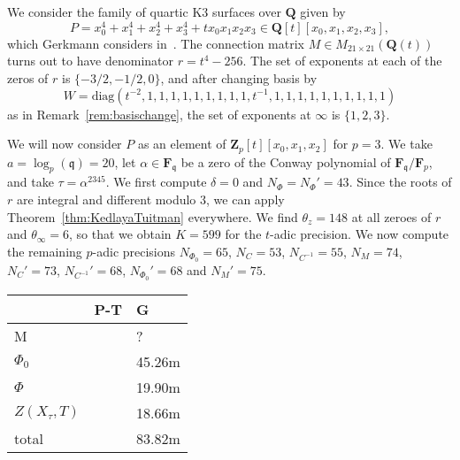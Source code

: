 \documentclass[a4paper,11pt]{article}
\numberwithin{equation}{section}
\newcommand{\ZZ}{\mathbf{Z}} %
\newcommand{\QQ}{\mathbf{Q}} %
\newcommand{\FF}{\mathbf{F}} %
\theoremstyle{definition}
\begin{document}
We consider the family of quartic K3 surfaces over $\QQ$ given by
\begin{equation*}
P=x_0^4 + x_1^4 + x_2^4 + x_3^4 + t x_0 x_1 x_2 x_3 \in \QQ[t][x_0,x_1,x_2,x_3],
\end{equation*}
which Gerkmann considers in~\citep[\S 7.5]{Gerkmann2007}. The connection matrix 
$M \in M_{21 \times 21}(\QQ(t))$ turns out to have denominator 
$r=t^4-256$. The set of exponents at each of the zeros of $r$ is $\{-3/2,-1/2,0\}$, 
and after changing basis by
\[
W=\mbox{diag}(t^{-2},1,1,1,1,1,1,1,1,1,t^{-1},1,1,1,1,1,1,1,1,1,1)
\] 
as in Remark~\ref{rem:basischange}, the set of exponents  at $\infty$ is 
$\{1,2,3\}$. 

We will now consider $P$ as an element of $\ZZ_p[t][x_0,x_1,x_2]$
for $p=3$. We take $a=\log_p(\mathfrak{q})=20$, let $\alpha \in \FF_{\mathfrak{q}}$
be a zero of the Conway polynomial of $\FF_{\mathfrak{q}}/\FF_{p}$, and take
$\tau=\alpha^{2345}$.  We first compute $\delta=0$ and $N_{\Phi}=N_{\Phi}'=43$.  
Since the roots of $r$ are integral and different modulo $3$, we can apply 
Theorem~\ref{thm:KedlayaTuitman} everywhere. We find $\theta_z=148$ at all zeroes 
of $r$ and $\theta_{\infty}=6$, so that we
obtain $K=599$ for the $t$-adic precision. We now compute the remaining $p$-adic 
precisions $N_{\Phi_0}=65$, $N_C=53$, $N_{C^{-1}}=55$, $N_M=74$, 
$N_C'=73$, $N_{C^{-1}}'=68$, $N_{\Phi_0}'=68$ and $N_M'=75$. \\

\begin{tabular}{l|l|l}
                 & \mbox{P-T} & \mbox{G}          \\
\hline                 
M                &              &  ?              \\
\hline                 
$\Phi_0$         &              & 45.26m          \\
\hline                 
$\Phi$           &              & 19.90m          \\
\hline
$Z(X_{\tau},T)$  &              & 18.66m          \\
\hline
total            &              & 83.82m          \\
\end{tabular}
\end{document}
